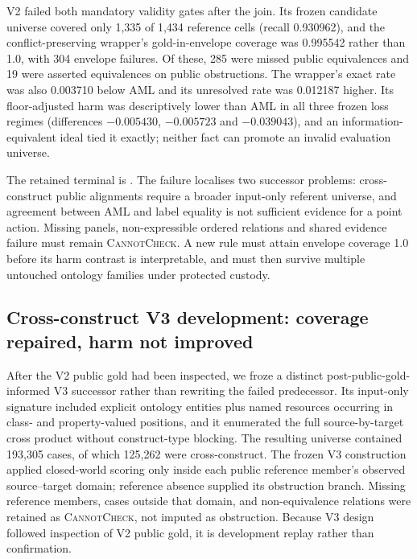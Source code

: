 V2 failed both mandatory validity gates after the join.  Its frozen candidate
universe covered only 1,335 of 1,434 reference cells (recall 0.930962), and the
conflict-preserving wrapper's gold-in-envelope coverage was 0.995542 rather
than 1.0, with 304 envelope failures.  Of these, 285 were missed public
equivalences and 19 were asserted equivalences on public obstructions.  The
wrapper's exact rate was also 0.003710 below AML and its unresolved rate was
0.012187 higher.  Its floor-adjusted harm was descriptively lower than AML in
all three frozen loss regimes (differences $-0.005430$, $-0.005723$ and
$-0.039043$), and an information-equivalent ideal tied it exactly; neither fact
can promote an invalid evaluation universe.

The retained terminal is
.
The failure localises two successor problems: cross-construct public alignments
require a broader input-only referent universe, and agreement between AML and
label equality is not sufficient evidence for a point action.  Missing panels,
non-expressible ordered relations and shared evidence failure must remain
\textsc{CannotCheck}.  A new rule must attain envelope coverage 1.0 before its
harm contrast is interpretable, and must then survive multiple untouched
ontology families under protected custody.

\subsection{Cross-construct V3 development: coverage repaired, harm not improved}

After the V2 public gold had been inspected, we froze a distinct
post-public-gold-informed V3 successor rather than rewriting the failed
predecessor. Its input-only signature included explicit ontology entities plus
named resources occurring in class- and property-valued positions, and it
enumerated the full source-by-target cross product without construct-type
blocking. The resulting universe contained 193,305 cases, of which 125,262
were cross-construct. The frozen V3 construction applied closed-world scoring
only inside each public reference member's observed source--target domain;
reference absence supplied its obstruction branch. Missing reference
members, cases outside that domain, and non-equivalence relations were retained
as \textsc{CannotCheck}, not imputed as obstruction. Because V3 design followed
inspection of V2 public gold, it is development replay rather than
confirmation.

